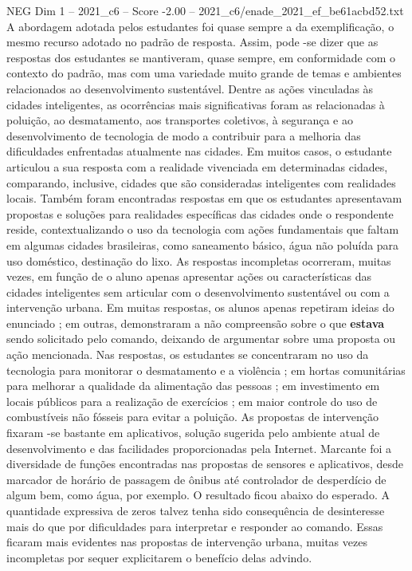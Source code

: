 \begin{textsample}{NEG Dim 1 – 2021\_c6 – Score -2.00 – 2021\_c6/enade\_2021\_ef\_be61acbd52.txt}
A abordagem adotada pelos estudantes foi quase sempre a da exemplificação, o mesmo recurso adotado no padrão de resposta.
Assim, pode -se dizer que as respostas dos estudantes se mantiveram, quase sempre, em conformidade com o contexto do padrão, mas com uma variedade muito grande de temas e ambientes relacionados ao desenvolvimento sustentável.
Dentre as ações vinculadas às cidades inteligentes, as ocorrências mais significativas foram as relacionadas à poluição, ao desmatamento, aos transportes coletivos, à segurança e ao desenvolvimento de tecnologia de modo a contribuir para a melhoria das dificuldades enfrentadas atualmente nas cidades.
Em muitos casos, o estudante articulou a sua resposta com a realidade vivenciada em determinadas cidades, comparando, inclusive, cidades que são consideradas inteligentes com realidades locais.
Também foram encontradas respostas em que os estudantes apresentavam propostas e soluções para realidades específicas das cidades onde o respondente reside, contextualizando o uso da tecnologia com ações fundamentais que faltam em algumas cidades brasileiras, como saneamento básico, água não poluída para uso doméstico, destinação do lixo.
As respostas incompletas ocorreram, muitas vezes, em função de o aluno apenas apresentar ações ou características das cidades inteligentes sem articular com o desenvolvimento sustentável ou com a intervenção urbana.
Em muitas respostas, os alunos apenas repetiram ideias do enunciado ; em outras, demonstraram a não compreensão sobre o que \textbf{estava} sendo solicitado pelo comando, deixando de argumentar sobre uma proposta ou ação mencionada.
Nas respostas, os estudantes se concentraram no uso da tecnologia para monitorar o desmatamento e a violência ; em hortas comunitárias para melhorar a qualidade da alimentação das pessoas ; em investimento em locais públicos para a realização de exercícios ; em maior controle do uso de combustíveis não fósseis para evitar a poluição.
As propostas de intervenção fixaram -se bastante em aplicativos, solução sugerida pelo ambiente atual de desenvolvimento e das facilidades proporcionadas pela Internet.
Marcante foi a diversidade de funções encontradas nas propostas de sensores e aplicativos, desde marcador de horário de passagem de ônibus até controlador de desperdício de algum bem, como água, por exemplo.
O resultado ficou abaixo do esperado.
A quantidade expressiva de zeros talvez tenha sido consequência de desinteresse mais do que por dificuldades para interpretar e responder ao comando.
Essas ficaram mais evidentes nas propostas de intervenção urbana, muitas vezes incompletas por sequer explicitarem o benefício delas advindo.

\end{textsample}
